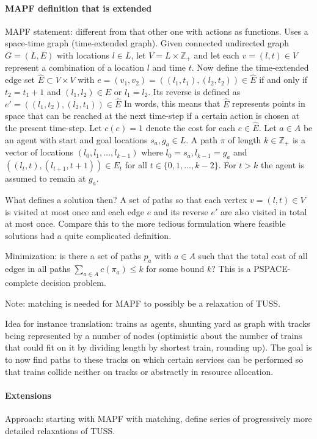 \documentclass[a4paper,10pt,english]{article}
\begin{document}
	\paragraph{MAPF definition that is extended}
	MAPF statement: different from that other one with actions as functions. Uses a space-time graph (time-extended graph). Given connected undirected graph $G = (L,E)$ with
	 locations $l \in L$, let $V = L \times \mathbb{Z}_+$ and let each $v = (l,t) \in V$ represent a combination of a location $l$ and time $t$. Now define the time-extended edge set $\hat E \subset V \times V$ with $e = (v_1,v_2) = ((l_1,t_1),(l_2,t_2))\in \hat E$ if and only if $t_2  = t_1 + 1$ and $(l_1,l_2)\in E$ or $l_1 = l_2$. Its reverse is defined as $e' = ((l_1,t_2),(l_2,t_1)) \in \hat E$ In words, this means that $\hat E$ represents points in space that can be reached at the next time-step if a certain action is chosen at the present time-step. Let $c(e) = 1$ denote the cost for each $e\in \hat E$. Let $a \in A$ be an agent with start and goal locations $s_a,g_a\in L$. A path $\pi$ of length $k\in\mathbb{Z}_+$ is a vector of locations $(l_0,l_1,\ldots,l_{k-1})$ where $l_0 = s_a, l_{k-1} = g_a$ and $((l_t,t),(l_{t+1},t+1))\in E_t$ for all $t\in\{0,1,\ldots,k-2\}$. For $t>k$ the agent is assumed to remain at $g_a$.
	 
	 What defines a solution then? A set of paths so that each vertex $v = (l,t)\in V$ is visited at most once and each edge $e$ and its reverse $e'$ are also visited in total at most once. Compare this to the more tedious formulation where feasible solutions had a quite complicated definition.
	 
	 Minimization: is there a set of paths $p_a$ with $a\in A$ such that the total cost of all edges in all paths $\sum_{a\in A} c(\pi_a) \leq k$ for some bound $k$? This is a PSPACE-complete decision problem.
	 
	 Note: matching is needed for MAPF to possibly be a relaxation of TUSS.
	 
	 Idea for instance translation: trains as agents, shunting yard as graph with tracks being represented by  a number of nodes (optimistic about the number of trains that could fit on it by dividing length by shortest train, rounding up). The goal is to now find paths to these tracks on which certain services can be performed so that trains collide neither on tracks or abstractly in resource allocation.
	 
	 \paragraph{Extensions}
	 Approach: starting with MAPF with matching, define series of progressively more detailed relaxations of TUSS.
	 
\end{document}
